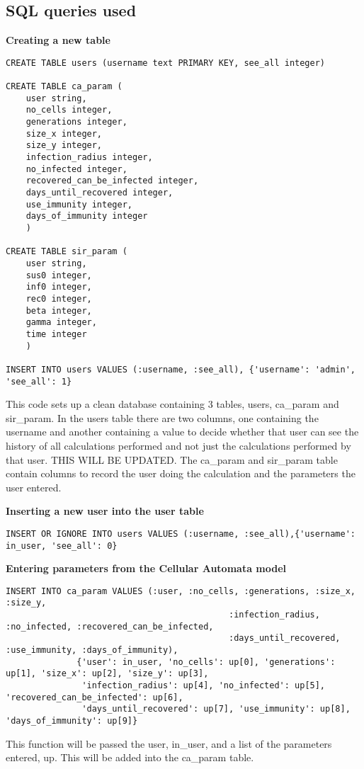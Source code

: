 \subsection{SQL queries used}
\textbf{Creating a new table}
\begin{lstlisting}
CREATE TABLE users (username text PRIMARY KEY, see_all integer)

CREATE TABLE ca_param (
    user string,
    no_cells integer,
    generations integer,
    size_x integer,
    size_y integer,
    infection_radius integer,
    no_infected integer,
    recovered_can_be_infected integer,
    days_until_recovered integer,
    use_immunity integer,
    days_of_immunity integer    
    )

CREATE TABLE sir_param (
    user string,
    sus0 integer,
    inf0 integer,
    rec0 integer,
    beta integer,
    gamma integer,
    time integer
    )

INSERT INTO users VALUES (:username, :see_all), {'username': 'admin', 'see_all': 1}
\end{lstlisting}
This code sets up a clean database containing 3 tables, users, ca_param and sir_param. In the users table there are two columns, one containing the username and another containing a value to decide whether that user can see the history of all calculations performed and not just the calculations performed by that user. THIS WILL BE UPDATED. The ca_param and sir_param table contain columns to record the user doing the calculation and the parameters the user entered.

\textbf{Inserting a new user into the user table}
\begin{lstlisting}
INSERT OR IGNORE INTO users VALUES (:username, :see_all),{'username': in_user, 'see_all': 0}
\end{lstlisting}

\textbf{Entering parameters from the Cellular Automata model}
\begin{lstlisting}
INSERT INTO ca_param VALUES (:user, :no_cells, :generations, :size_x, :size_y,
                                            :infection_radius, :no_infected, :recovered_can_be_infected,
                                            :days_until_recovered, :use_immunity, :days_of_immunity),
              {'user': in_user, 'no_cells': up[0], 'generations': up[1], 'size_x': up[2], 'size_y': up[3],
               'infection_radius': up[4], 'no_infected': up[5], 'recovered_can_be_infected': up[6],
               'days_until_recovered': up[7], 'use_immunity': up[8], 'days_of_immunity': up[9]}
\end{lstlisting}
This function will be passed the user, in_user, and a list of the parameters entered, up. This will be added into the ca_param table.